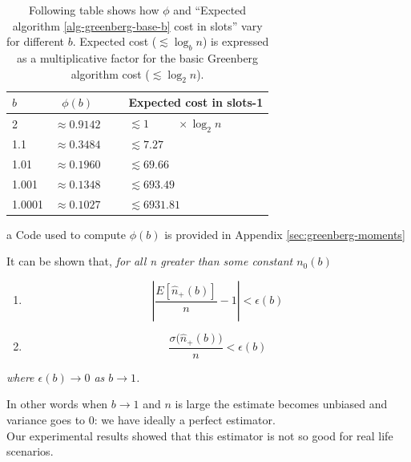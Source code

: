 \documentclass[12pt,a4paper]{report}
\begin{document}
\begin{table}[H]
\caption[\emph{Greenberg}: different $b$ summary]{Following table shows how $\phi$ and ``Expected algorithm \ref{alg-greenberg-base-b} cost in slots'' vary for different $b$. Expected cost ($\lesssim \log_{b}n$) is expressed as a multiplicative factor for the basic Greenberg algorithm cost ($\lesssim \log_{2}n$).}
\label{table:greenberg-b-phi}
\begin{center}
\begin{threeparttable}
\begin{tabular}{lccl}
$b$ & $\phi(b)$\tnote{a} &\,\,\,& Expected cost in slots-1\\
\toprule
2          & $\approx 0.9142$ && $\lesssim 1 \qquad\,\,\, \times \log_{2} n$\\
1.1       & $\approx 0.3484$ && $ \lesssim 7.27$\\
1.01     & $\approx 0.1960$ && $ \lesssim 69.66$\\
1.001   & $\approx 0.1348$ && $ \lesssim 693.49$\\
1.0001 & $\approx 0.1027$ && $ \lesssim 6931.81$\\
\bottomrule
\end{tabular}
\begin{tablenotes}
\item [a] {\footnotesize \smaller Code used to compute $\phi(b)$ is provided in Appendix \ref{sec:greenberg-moments}}
\end{tablenotes}
\end{threeparttable}
\end{center}
\end{table}

It can be shown \cite{greenberg87} that, \emph{for all n greater than some constant $n_{0}(b)$}
\begin{enumerate}
\item \begin{equation} 
		\left |\frac{E[\hat{n}_{+}(b)]}{n}-1 \right | < \epsilon(b) 
	  \end{equation}
\item \begin{equation}
		\frac{\sigma\bigl(\hat{n}_{+}(b)\bigr)}{n}< \epsilon(b)
	\end{equation}
\end{enumerate}
\emph{where $\epsilon(b) \to 0$ as $b \to 1$.}

In other words when $b \to 1$ and $n$ is large the estimate becomes unbiased and variance goes to 0: we have ideally a perfect estimator.\\
Our experimental results showed that this estimator is not so good for real life scenarios.  
\end{document}
